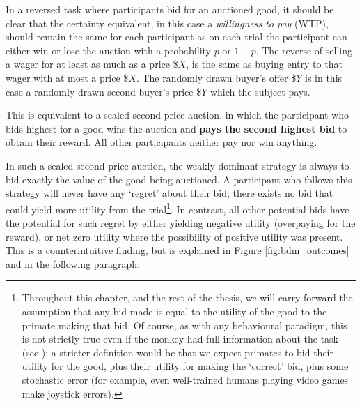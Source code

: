 In a reversed task where participants bid for an auctioned good, it should be clear that the certainty equivalent, in this case a \textit{willingness to pay} (WTP), should remain the same for each participant as on each trial the participant can either win or lose the auction with a probability $p$ or $1-p$. The reverse of selling a wager for at least as much as a price \$$X$, is the same as buying entry to that wager with at most a price \$$X$. The randomly drawn buyer’s offer \$$Y$ is in this case a randomly drawn second buyer’s price \$$Y$ which the subject pays.

This is equivalent to a sealed second price auction, in which the participant who bids highest for a good wins the auction and \textbf{pays the second highest bid} to obtain their reward. All other participants neither pay nor win anything.

In such a sealed second price auction, the weakly dominant strategy is always to bid exactly the value of the good being auctioned. A participant who follows this strategy will never have any ‘regret’ about their bid; there exists no bid that could yield more utility from the trial\footnote{Throughout this chapter, and the rest of the thesis, we will carry forward the assumption that any bid made is equal to the utility of the good to the primate making that bid. Of course, as with any behavioural paradigm, this is not strictly true even if the monkey had full information about the task (see \cite{gretherMentalProcessesStrategic2007}); a stricter definition would be that we expect primates to bid their utility for the good, plus their utility for making the ‘correct’ bid, plus some stochastic error (for example, even well-trained humans playing video games make joystick errors).}. In contrast, all other potential bids have the potential for such regret by either yielding negative utility (overpaying for the reward), or net zero utility where the possibility of positive utility was present. This is a counterintuitive finding, but is explained in Figure \ref{fig:bdm_outcomes} and in the following paragraph:

